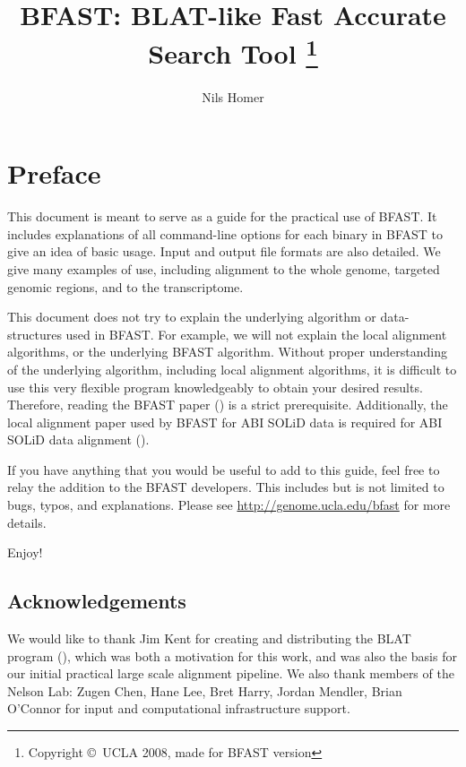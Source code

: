 \documentclass[a4paper,12pt]{book}
\author{Nils Homer}
\date{}
\title{BFAST: BLAT-like Fast Accurate Search Tool
\thanks{Copyright \copyright\ UCLA 2008, made for BFAST version \Version}
}
\begin{document}
\frontmatter

\maketitle

\tableofcontents
{}

\listoffigures
{}
\listoftables
{}

\chapter{Preface}
This document is meant to serve as a guide for the practical use of BFAST.
It includes explanations of all command-line options for each binary in BFAST to give an idea of basic usage.
Input and output file formats are also detailed.
We give many examples of use, including alignment to the whole genome, targeted genomic regions, and to the transcriptome.

This document does not try to explain the underlying algorithm or data-structures used in BFAST.
For example, we will not explain the local alignment algorithms, or the underlying BFAST algorithm.
Without proper understanding of the underlying algorithm, including local alignment algorithms, it is difficult to use this very flexible program knowledgeably to obtain your desired results.
Therefore, reading the BFAST paper (\cite{BFAST}) is a strict prerequisite.
Additionally, the local alignment paper used by BFAST for ABI SOLiD data is required for ABI SOLiD data alignment (\cite{BFAST-local-alignment}).

If you have anything that you would be useful to add to this guide, feel free to relay the addition to the BFAST developers.
This includes but is not limited to bugs, typos, and explanations.
Please see \url{http://genome.ucla.edu/bfast} for more details.

Enjoy!

\section{Acknowledgements}
We would like to thank Jim Kent for creating and distributing the BLAT program (\cite{BLAT}), which was both a motivation for this work, and was also the basis for our initial practical large scale alignment pipeline.
We also thank members of the Nelson Lab: Zugen Chen, Hane Lee, Bret Harry, Jordan Mendler, Brian O’Connor for input and computational infrastructure support.
\end{document}
